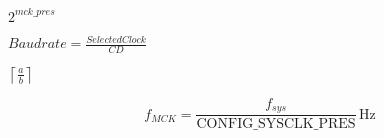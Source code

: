 \documentclass{article}
\begin{document}
$2^{mck\_pres}$
\pagebreak

$ Baudrate = \frac{SelectedClock}{CD} $
\pagebreak

$ \left\lceil \frac{a}{b} \right\rceil $
\pagebreak

\[
  f_{MCK} = \frac{f_{sys}}{\mathrm{CONFIG\_SYSCLK\_PRES}}\,\mbox{Hz}
\]
\pagebreak
\end{document}

